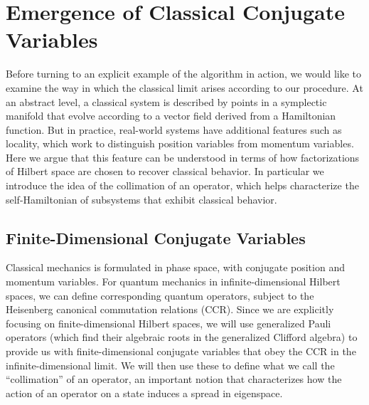 \documentclass[aps,pra,onecolumn,nofootinbib,11pt,tightenlines]{revtex4-1}
\begin{document}
\section{Emergence of Classical Conjugate Variables} 
\label{sec:conjugate}

{Before turning to an explicit example of the algorithm in action, we would like to examine the way in which the classical limit arises according to our procedure.
At an abstract level, a classical system is described by points in a symplectic manifold that evolve according to a vector field derived from a Hamiltonian function.
But in practice, real-world systems have additional features such as locality, which work to distinguish position variables from momentum variables.
Here we argue that this feature can be understood in terms of how factorizations of Hilbert space are chosen to recover classical behavior.
In particular we introduce the idea of the collimation of an operator, which helps characterize the self-Hamiltonian of subsystems that exhibit classical behavior.}

\subsection{Finite-Dimensional Conjugate Variables}

Classical mechanics is formulated in phase space, with conjugate position and momentum variables.
For quantum mechanics in infinite-dimensional Hilbert spaces, we can define corresponding quantum operators, subject to the Heisenberg canonical commutation relations (CCR). 
Since we are explicitly focusing on finite-dimensional Hilbert spaces, we will use generalized Pauli operators (which find their algebraic roots in the generalized Clifford algebra) to provide us with finite-dimensional conjugate variables that obey the CCR in the infinite-dimensional limit. 
We will then use these to define what we call the ``collimation'' of an operator, an important notion that characterizes how the action of an operator on a state induces a spread in eigenspace.
\end{document}
